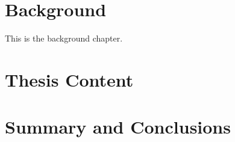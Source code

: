 \documentclass[a4paper,12pt,twoside]{book}
\begin{document}
\chapter{Background}
\label{sec_background}

This is the background chapter.

\chapter{Thesis Content}



\chapter{Summary and Conclusions}
\label{sec_conclusions}





\backmatter
\pagestyle{empty}
\ifluatex
    
\else
    
    \clearpage
\fi

\ifluatex
    
\else
    
    \clearpage
\fi
\end{document}
